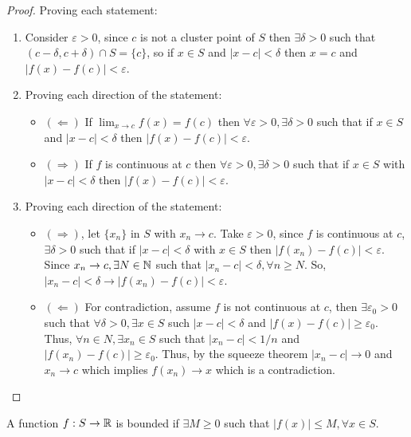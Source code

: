 \begin{proof}
    Proving each statement:
    \begin{enumerate}
        \item Consider $\varepsilon > 0$, since $c$ is not a cluster point of $S$ then $\exists \delta >0$ such that $(c-\delta, c+ \delta) \cap S = \{c\}$, so if $x \in S$ and $|x-c| < \delta$ then $x = c$ and $|f(x) - f(c)| < \varepsilon$.
        \item Proving each direction of the statement:
            \begin{itemize}
                \item $(\Longleftarrow)$ If $\lim_{x \to c} f(x) = f(c)$ then $\forall \varepsilon > 0, \exists \delta > 0$ such that if $x \in S$ and $|x-c| < \delta$ then $|f(x) - f(c)| < \varepsilon$.
                \item $(\Longrightarrow)$ If $f$ is continuous at $c$ then $\forall \varepsilon > 0, \exists \delta > 0$ such that if $x \in S$ with $|x-c| < \delta$ then $|f(x) - f(c)| < \varepsilon$.
            \end{itemize}
        \item Proving each direction of the statement:
            \begin{itemize}
                \item $(\Longrightarrow)$, let $\{x_n\}$ in $S$ with $x_n \to c$. Take $\varepsilon > 0$, since $f$ is continuous at $c$, $\exists \delta > 0$ such that if $|x-c| < \delta$ with $x \in S$ then $|f(x_n) - f(c)| < \varepsilon$. Since $x_n \to c, \exists N \in \mathbb{N}$ such that $|x_n-c| <  \delta, \forall n \geq N$. So, $|x_n-c| < \delta \longrightarrow |f(x_n) - f(c)| < \varepsilon$.
                \item $(\Longleftarrow)$ For contradiction, assume $f$ is not continuous at $c$, then $\exists \varepsilon_0 > 0$ such that $\forall \delta > 0, \exists x \in S$ such $|x-c| < \delta$ and $|f(x) - f(c)| \geq \varepsilon_0$. Thus, $\forall n \in N, \exists x_n \in S$ such that $|x_n-c| < 1/n$ and $|f(x_n) -  f(c)| \geq \varepsilon_0$. Thus, by the squeeze theorem $|x_n - c| \to 0$ and $x_n \to c$ which implies $f(x_n) \to x$ which is a contradiction.
            \end{itemize}
    \end{enumerate}
\end{proof}

\begin{definition}
    A function $f: S \to \mathbb{R}$ is bounded if $\exists M \geq 0$ such that $|f(x)| \leq M, \forall x \in S$.
\end{definition}


